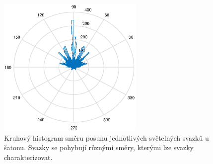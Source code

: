\begin{figure}[h!]
\begin{center}
\includegraphics[width = 7cm]{figures/saton_smer.eps}
\end{center}
\caption{Kruhový histogram směru posunu jednotlivých světelných svazků u šatonu. Svazky se pohybují různými směry, kterými lze svazky charakterizovat.}

\label{fig:kruhovy histogram saton}
\end{figure}

  
